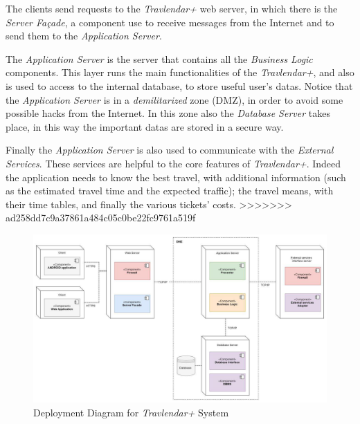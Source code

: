 The clients send requests to the \emph{Travlendar+} web server, in which there is the \emph{Server Façade}, a component use to receive messages from the Internet and to send them to the \emph{Application Server}.

The \emph{Application Server} is the server that contains all the \emph{Business Logic} components. This layer runs the main functionalities of the \emph{Travlendar+}, and also is used to access to the internal database, to store useful user's datas. Notice that the \emph{Application Server} is in a \emph{demilitarized} zone (DMZ), in order to avoid some possible hacks from the Internet. In this zone also the \emph{Database Server} takes place, in this way the important datas are stored in a secure way.

Finally the \emph{Application Server} is also used to communicate with the \emph{External Services}. These services are helpful to the core features of \emph{Travlendar+}. Indeed the application needs to know the best travel, with additional information (such as the estimated travel time and the expected traffic); the travel means, with their time tables, and finally the various tickets' costs.
>>>>>>> ad258dd7c9a37861a484c05c0be22fc9761a519f

\begin{figure}[H]
    \centering
    \includegraphics[scale=0.9]{Pictures/DeploymentPictures/deploymentDiagram.jpg}
    \caption{Deployment Diagram for \emph{Travlendar+} System}
\end{figure}